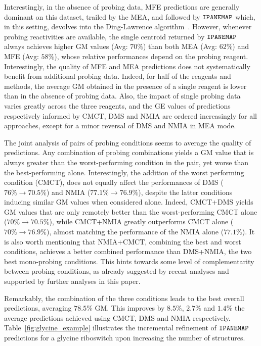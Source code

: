 \documentclass[a4,center,fleqn]{NAR}
\newcommand{\Software}[1]{$\text{\ttfamily #1}$}
\newcommand{\OurTool}{\Software{IPANEMAP}\xspace}
\begin{document}
Interestingly, in the absence of probing data, MFE predictions are generally dominant on this dataset, trailed by the MEA, and followed by \OurTool which, in this setting, devolves into the Ding-Lawrence algorithm~\citep{Ding2003}. However, whenever probing reactivities are available, the single centroid returned by \OurTool always achieves higher GM values (Avg: $70\%$) than both MEA (Avg: $62\%$) and MFE  (Avg: $58\%$), whose relative performances depend on the probing reagent.%
Interestingly, the quality of MFE and MEA predictions does not systematically benefit from additional probing data. Indeed, for half of the reagents and methods, the average GM obtained in the presence of a single reagent is lower than in the absence of probing data. Also, the impact of single probing data varies greatly across the three reagents, and the GE values of predictions respectively informed by CMCT, DMS and NMIA are ordered increasingly for all approaches, except for a minor reversal of DMS and NMIA in MEA mode.



The joint analysis of pairs of probing conditions seems to average the quality of predictions. Any combination of probing combinations yields a GM value that is always greater than the worst-performing condition in the pair, yet worse than the best-performing alone. Interestingly, the addition of the worst performing condition (CMCT), does not equally affect the performances of DMS ($76\% \to 70.5\%$) %
and NMIA  ($77.1\% \to 76.9\%$), %
despite the latter conditions inducing similar GM values when considered alone. Indeed, CMCT+DMS yields GM values that are only remotely better than the worst-performing CMCT alone  ($70\% \to 70.5\%$), while CMCT+NMIA greatly outperforms CMCT alone  ($70\% \to 76.9\%$), almost matching the performance of the NMIA alone ($77.1\%$). It is also worth mentioning that NMIA+CMCT, combining the best and worst conditions, achieves a better combined performance than DMS+NMIA, the two best mono-probing conditions. This hints towards some level of complementarity between probing conditions, as already suggested by recent analyses \citep{Yu2018} and supported by further analyses in this paper.

Remarkably, the combination of the three conditions leads to the best overall predictions, averaging $78.5\%$ GM.
This improves by $8.5\%$, $2.7\%$ and $1.4\%$ the average predictions achieved using CMCT, DMS and NMIA respectively.
Table~\ref{fig:glycine_example} illustrates the incremental refinement of \OurTool predictions for a glycine riboswitch upon increasing the number of structures.
\end{document}
